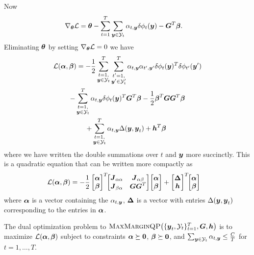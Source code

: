 \documentclass[10pt,journal,letterpaper,compsoc]{IEEEtran}
\newcommand{\mmqp}[3]{\textrm{\sc MaxMarginQP}\!\left(\{\by_t, #1\}_{t=1}^{T}, #2, #3\right)}
\begin{document}
Now
\begin{align}
\nabla_{\btheta} \Ell 
&= \btheta - \sum_{t=1}^T \sum_{\by \in \Y_t} \alpha_{t,\by} \delta\phi_t(\by) - \bG^T\bbeta.
\end{align}
%
Eliminating $\boldsymbol{\theta}$ by setting $\nabla_{\btheta} \Ell = 0$ we have
%
\begin{multline}
  \Ell(\balpha, \bbeta) =
  -\frac{1}{2} \sum_{\substack{t=1,\\\by \in \Y_t}}^{T} \sum_{\substack{t'=1,\\\by' \in \Y_t'}}^{T}
  \alpha_{t, \by} \alpha_{t', \by'} \delta\phi_t(\by)^T \delta\phi_{t'}(\by') \\
  - \sum_{\substack{t=1,\\\by \in \Y_t}}^{T} \alpha_{t, \by} \delta\phi_t(\by)^T \bG^T \bbeta
  -\frac{1}{2} \bbeta^T \bG \bG^T \bbeta \\
  + \sum_{\substack{t=1,\\\by \in \Y_t}}^{T} \alpha_{t, \by} \Delta(\by, \by_t) + \bh^T \bbeta\
  \label{eqn:lagrangian3}
\end{multline}
%
where we have written the double summations over $t$ and ${\boldsymbol{y}}$ more
succinctly. This is a quadratic equation that can be written more
compactly as
%
\begin{align}
  \Ell(\balpha, \bbeta) &=
  -\frac{1}{2} \begin{bmatrix}\balpha \\ \bbeta \end{bmatrix}^T 
  \!\! \begin{bmatrix}\bJ_{\alpha\alpha} & \bJ_{\alpha\beta} \\ \bJ_{\beta\alpha} & \bG\bG^T \end{bmatrix}
  \! \begin{bmatrix}\balpha \\ \bbeta \end{bmatrix} +
  \begin{bmatrix} \bDelta \\ \bh \end{bmatrix}^T \!\! \begin{bmatrix}\balpha \\ \bbeta \end{bmatrix}
  \label{eqn:lagrangian_matrix}
\end{align}
%
where $\boldsymbol{\alpha}$ is a vector containing the $\alpha_{t,{\boldsymbol{y}}}$, $\boldsymbol{\Delta}$
is a vector with entries $\Delta({\boldsymbol{y}}, {\boldsymbol{y}}_t)$ corresponding to the
entries in $\boldsymbol{\alpha}$.

The dual optimization problem to $\mmqp{\Y_t}{\bG}{\bh}$ is to
maximize $\Ell(\balpha, \bbeta)$ subject to constraints $\boldsymbol{\alpha}
\succeq \textbf{0}$, $\boldsymbol{\beta} \succeq \textbf{0}$, and $\sum_{\by \in \Y_t}
\alpha_{t,\by} \leq \frac{C}{T}$ for $t = 1, \ldots, T$.
\end{document}

